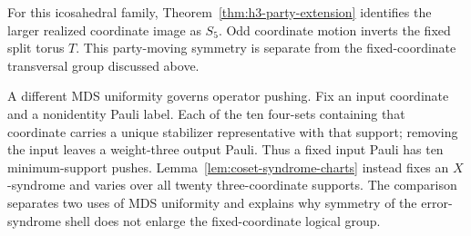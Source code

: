 \begin{remark}
For this icosahedral family, Theorem~\ref{thm:h3-party-extension} identifies
the larger realized coordinate image as \(S_5\).  Odd coordinate motion
inverts the fixed split torus \(T\).  This party-moving symmetry is separate
from the fixed-coordinate transversal group discussed above.
\end{remark}

A different MDS uniformity governs operator pushing.  Fix an input coordinate
and a nonidentity Pauli label.  Each of the ten four-sets containing that
coordinate carries a unique stabilizer representative with that support;
removing the input leaves a weight-three output Pauli.  Thus a fixed input
Pauli has ten minimum-support pushes.  Lemma~\ref{lem:coset-syndrome-charts}
instead fixes an \(X\)-syndrome and varies over all twenty three-coordinate
supports.  The comparison separates two uses of MDS uniformity and explains
why symmetry of the error-syndrome shell does not enlarge the
fixed-coordinate logical group.
